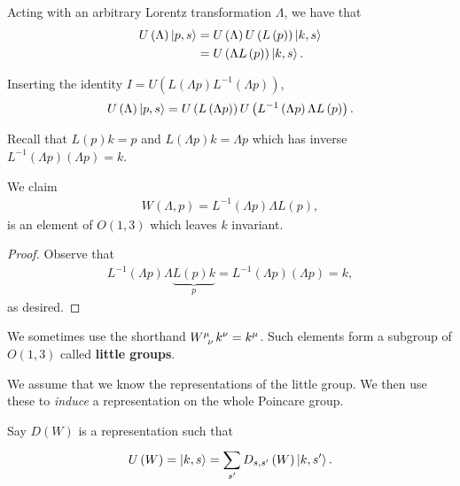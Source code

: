 
Acting with an arbitrary Lorentz transformation $\Lambda$, we have that
\begin{align}
    U \left( \Lambda \right)  \ket{p,s} &= U \left( \Lambda \right) U \left( L \left( p \right)  \right) \ket{k,s} \\
    &= U \left( \Lambda L \left( p \right)  \right) \ket{k,s} 
.\end{align}

Inserting the identity $I = U \left( L \left( \Lambda p \right) L^{-1} \left( \Lambda p \right)  \right) $,
\begin{align}\label{eq:induce_reps}
    U \left( \Lambda \right) \ket{p,s} = U \left( L \left( \Lambda p \right)  \right)  U \left( L^{-1} \left( \Lambda p \right) \Lambda L \left( p \right)  \right) 
.\end{align}

Recall that $L \left( p \right) k = p$ and $L \left( \Lambda p  \right) k = \Lambda p$ which has inverse $L^{-1} \left( \Lambda p  \right) \left( \Lambda p \right) = k$. 

\begin{claim}
    We claim
    \begin{align}
        W \left( \Lambda, p \right) = L^{-1} \left( \Lambda p  \right) \Lambda L \left( p \right) 
    ,\end{align}
    is an element of $O \left( 1,3 \right) $ which leaves $k$ invariant.
\end{claim}

\begin{proof}
    Observe that 
    \begin{align}
        L^{-1} \left( \Lambda p \right) \Lambda \underbrace{L \left( p \right) k}_{p} = L^{-1} \left( \Lambda p \right) \left( \Lambda p  \right) = k
    ,\end{align}
    as desired.
\end{proof}

We sometimes use the shorthand $\tensor{W}{^{\mu}_\nu} k^{\nu} = k^{\mu}$. Such elements form a subgroup of $O \left( 1,3 \right) $ called \textbf{little groups}.

We assume that we know the representations of the little group. We then use these to \textit{induce} a representation on the whole Poincare group.

Say $D \left( W \right) $ is a representation such that 
\begin{align}
    U \left( W \right) = \ket{k,s} = \sum_{s'}^{} D_{s,s'} \left( W \right) \ket{k,s'} 
.\end{align}

